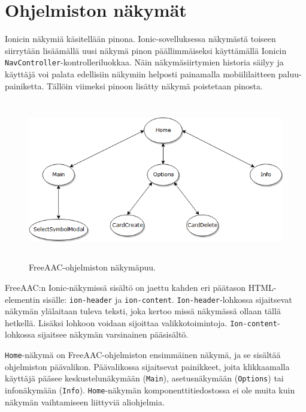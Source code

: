 \documentclass[utf8]{gradu3}
\begin{document}
\section{Ohjelmiston näkymät}

Ionicin näkymiä käsitellään pinona. Ionic-sovelluksessa näkymästä toiseen siirrytään lisäämällä uusi näkymä pinon päällimmäiseksi käyttämällä Ionicin \texttt{NavController}\nobreakdash-\hspace{0pt}kontrolleriluokkaa. Näin näkymäsiirtymien historia säilyy ja käyttäjä voi palata edellisiin näkymiin helposti painamalla mobiililaitteen paluu-painiketta. Tällöin viimeksi pinoon lisätty näkymä poistetaan pinosta.

\begin{figure}[h]\centering
  \includegraphics[height=7cm,keepaspectratio]{FreeAACViews}
  \caption[FreeAAC-sovelluksen näkymäpuu.]
  {FreeAAC-ohjelmiston näkymäpuu.}
  \label{fig:FreeAACViews}
\end{figure}

FreeAAC:n Ionic-näkymissä sisältö on jaettu kahden eri päätason HTML-elementin sisälle: \texttt{ion-header} ja \texttt{ion-content}. \texttt{Ion-header}-lohkossa sijaitsevat näkymän ylälaitaan tuleva teksti, joka kertoo missä näkymässä ollaan tällä hetkellä. Lisäksi lohkoon voidaan sijoittaa valikkotoimintoja. \texttt{Ion-content}-lohkossa sijaitsee näkymän varsinainen pääsisältö.

\texttt{Home}-näkymä on FreeAAC-ohjelmiston ensimmäinen näkymä, ja se sisältää ohjelmiston päävalikon. Päävalikossa sijaitsevat painikkeet, joita klikkaamalla käyttäjä pääsee keskustelunäkymään (\texttt{Main}), asetusnäkymään (\texttt{Options}) tai infonäkymään (\texttt{Info}). \texttt{Home}\nobreakdash-\hspace{0pt}näkymän komponenttitiedostossa ei ole muita kuin näkymän vaihtamiseen liittyviä aliohjelmia.
\end{document}
